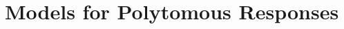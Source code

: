 \documentclass[11pt]{report}\usepackage[]{graphicx}\usepackage[]{color}
\begin{document}
\begin{Exercises}
%   

\end{Exercises}


\chapter[Models for Polytomous Responses]{Models for Polytomous \mbox{Responses}}\label{ch:polytomous}
\end{document}
